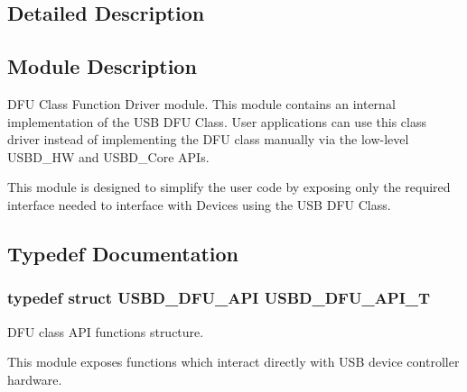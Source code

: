 \subsection{Detailed Description}
\hypertarget{group__USBD__MSC_Sec_MSCModDescription}{}\subsection{Module Description}\label{group__USBD__MSC_Sec_MSCModDescription}
D\-F\-U Class Function Driver module. This module contains an internal implementation of the U\-S\-B D\-F\-U Class. User applications can use this class driver instead of implementing the D\-F\-U class manually via the low-\/level U\-S\-B\-D\-\_\-\-H\-W and U\-S\-B\-D\-\_\-\-Core A\-P\-Is.

This module is designed to simplify the user code by exposing only the required interface needed to interface with Devices using the U\-S\-B D\-F\-U Class. 

\subsection{Typedef Documentation}
\hypertarget{group__USBD__DFU_gadf9281f8af1223053e3ccf48e26ac80d}{
\subsubsection[{U\-S\-B\-D\-\_\-\-D\-F\-U\-\_\-\-A\-P\-I\-\_\-\-T}]{\setlength{\rightskip}{0pt plus 5cm}typedef struct {\bf U\-S\-B\-D\-\_\-\-D\-F\-U\-\_\-\-A\-P\-I}  {\bf U\-S\-B\-D\-\_\-\-D\-F\-U\-\_\-\-A\-P\-I\-\_\-\-T}}}\label{group__USBD__DFU_gadf9281f8af1223053e3ccf48e26ac80d}


D\-F\-U class A\-P\-I functions structure.

This module exposes functions which interact directly with U\-S\-B device controller hardware. 

